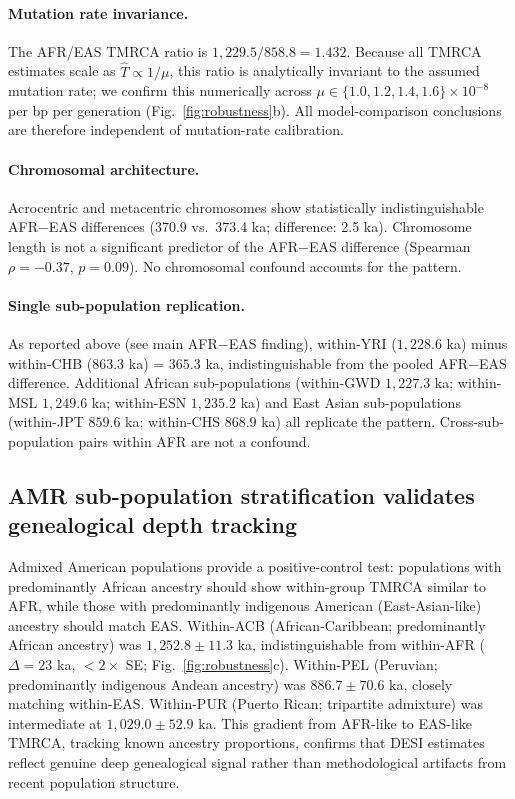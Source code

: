 \paragraph{Mutation rate invariance.}
The AFR/EAS TMRCA ratio is $1{,}229.5/858.8 = 1.432$. Because all TMRCA estimates scale as $\hat{T} \propto 1/\mu$, this ratio is analytically invariant to the assumed mutation rate; we confirm this numerically across $\mu \in \{1.0, 1.2, 1.4, 1.6\} \times 10^{-8}$ per bp per generation (Fig.~\ref{fig:robustness}b). All model-comparison conclusions are therefore independent of mutation-rate calibration.

\paragraph{Chromosomal architecture.}
Acrocentric and metacentric chromosomes show statistically indistinguishable AFR$-$EAS differences (370.9 vs.\ 373.4 ka; difference: 2.5 ka). Chromosome length is not a significant predictor of the AFR$-$EAS difference (Spearman $\rho = -0.37$, $p = 0.09$). No chromosomal confound accounts for the pattern.

\paragraph{Single sub-population replication.}
As reported above (see main AFR$-$EAS finding), within-YRI ($1{,}228.6$ ka) minus within-CHB ($863.3$ ka) = $365.3$ ka, indistinguishable from the pooled AFR$-$EAS difference. Additional African sub-populations (within-GWD $1{,}227.3$ ka; within-MSL $1{,}249.6$ ka; within-ESN $1{,}235.2$ ka) and East Asian sub-populations (within-JPT $859.6$ ka; within-CHS $868.9$ ka) all replicate the pattern. Cross-sub-population pairs within AFR are not a confound.

\subsection*{AMR sub-population stratification validates genealogical depth tracking}

Admixed American populations provide a positive-control test: populations with predominantly African ancestry should show within-group TMRCA similar to AFR, while those with predominantly indigenous American (East-Asian-like) ancestry should match EAS. Within-ACB (African-Caribbean; predominantly African ancestry) was $1{,}252.8 \pm 11.3$ ka, indistinguishable from within-AFR ($\Delta = 23$ ka, $<2 \times$ SE; Fig.~\ref{fig:robustness}c). Within-PEL (Peruvian; predominantly indigenous Andean ancestry) was $886.7 \pm 70.6$ ka, closely matching within-EAS. Within-PUR (Puerto Rican; tripartite admixture) was intermediate at $1{,}029.0 \pm 52.9$ ka. This gradient from AFR-like to EAS-like TMRCA, tracking known ancestry proportions, confirms that DESI estimates reflect genuine deep genealogical signal rather than methodological artifacts from recent population structure.
